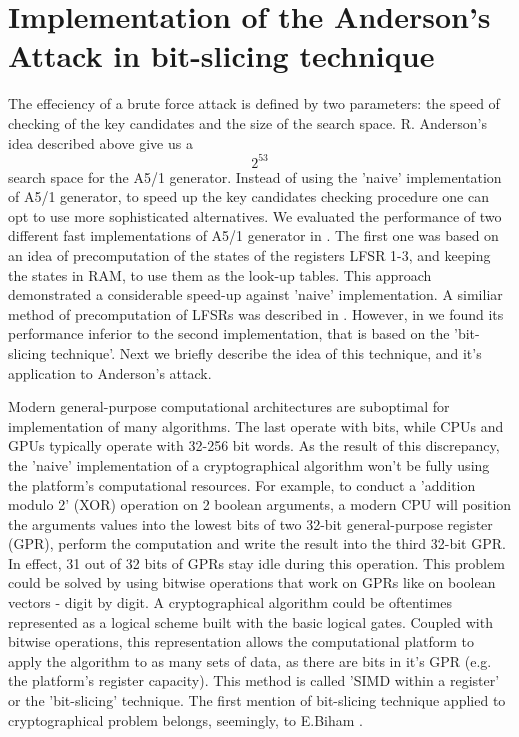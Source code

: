 \documentclass[runningheads,a4paper]{llncs}[2015/06/24]
\begin{document}
\section{Implementation of the Anderson's Attack in bit-slicing
technique}\label{sec:bitslc}

The effeciency of a brute force attack is defined by two parameters: the speed
of checking of the key candidates and the size of the search space. R.
Anderson's idea described above give us a $$2^{53}$$ search space for the A5/1
generator. Instead of using the 'naive' implementation of A5/1 generator, to
speed up the key candidates checking procedure one can opt to use more
sophisticated alternatives. We evaluated the performance of two different fast
implementations of A5/1 generator in \cite{PAVT_2016}. The first one was based
on an idea of precomputation of the states of the registers LFSR 1-3, and
keeping the states in RAM, to use them as the look-up tables. This approach
demonstrated a considerable speed-up against 'naive' implementation. A similiar
method of precomputation of LFSRs was described in \cite{BSW}. However, in
\cite{PAVT_2016} we found its performance inferior to the second
implementation, that is based on the 'bit-slicing technique'. Next we briefly
describe the idea of this technique, and it's application to Anderson's attack.

Modern general-purpose computational architectures are suboptimal for
implementation of many algorithms. The last operate with bits, while CPUs and
GPUs typically operate with 32-256 bit words. As the result of this
discrepancy, the 'naive' implementation of a cryptographical algorithm won't be
fully using the platform's computational resources. For example, to conduct a
'addition modulo 2' (XOR) operation on 2 boolean arguments, a modern CPU will
position the arguments values into the lowest bits of two 32-bit
general-purpose register (GPR), perform the computation and write the result
into the third 32-bit GPR. In effect, 31 out of 32 bits of GPRs stay idle
during this operation. This problem could be solved by using bitwise operations
that work on GPRs like on boolean vectors - digit by digit. A cryptographical
algorithm could be oftentimes represented as a logical scheme built with the
basic logical gates. Coupled with bitwise operations, this representation
allows the computational platform to apply the algorithm to as many sets of
data, as there are bits in it's GPR (e.g. the platform's register capacity).
This method is called 'SIMD within a register' or the 'bit-slicing' technique.
The first mention of bit-slicing technique applied to cryptographical problem
belongs, seemingly, to E.Biham \cite{BIT_SL}.
\end{document}
